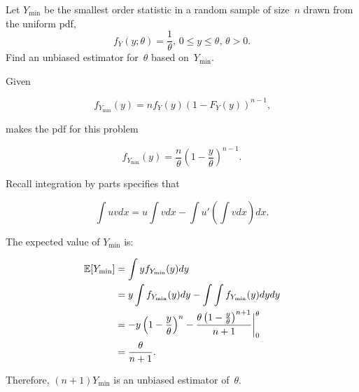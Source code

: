 \begin{problem}
   Let $Y_{\min}$ be the smallest order statistic in a random sample of size~$n$ drawn from the uniform pdf,
  \begin{equation*}
    f_Y(y;\theta) = \frac{1}{\theta}\text{, } 0 \leq y \leq \theta \text{, } \theta > 0\text{.}
  \end{equation*}
  Find an unbiased estimator for~$\theta$ based on~$Y_{\min}$.
\end{problem}

Given

\begin{equation}
  f_{Y_{\min}}(y) = n f_{Y}(y) (1 - F_{Y}(y))^{n-1}\text{,}
\end{equation}

\noindent
makes the pdf for this problem

\begin{equation}
  f_{Y_{\min}}(y) = \frac{n}{\theta} \left(1 - \frac{y}{\theta} \right)^{n-1}\text{.}
\end{equation}

Recall integration by parts specifies that

\begin{equation}
  \int uv dx = u\int v dx - \int u' \left( \int v dx \right) dx \text{.}
\end{equation}

\noindent
The expected value of $Y_{\min}$ is:

\begin{align}
  \mathbb{E}\lbrack Y_{\min}\rbrack &= \int y f_{Y_{\min}}(y) dy \\
                    &= y\int f_{Y_{\min}}(y) dy - \int \int f_{Y_{\min}}(y) dy dy \\
                    &= -y\left(1 - \frac{y}{\theta}\right)^{n}- \frac{\theta \left(1 - \frac{y}{\theta}\right)^{n+1}}{n+1} \bigg\vert_{0}^{\theta} \\
                    &= \frac{\theta}{n+1}\text{.}
 \end{align}

 Therefore, $\boxed{(n+1)Y_{\min}}$ is an unbiased estimator of~$\theta$.
